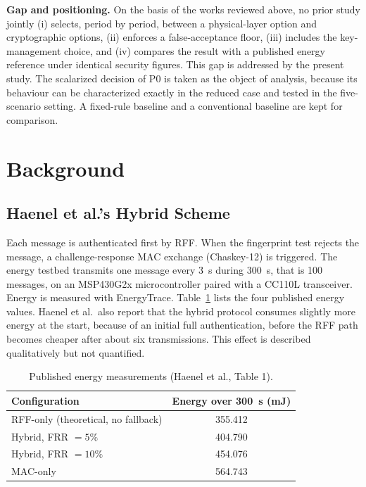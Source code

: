 \documentclass[conference]{IEEEtran}
\begin{document}
\textbf{Gap and positioning.} On the basis of the works reviewed above, no prior study jointly (i) selects, period by period, between a physical-layer option and cryptographic options, (ii) enforces a false-acceptance floor, (iii) includes the key-management choice, and (iv) compares the result with a published energy reference under identical security figures. This gap is addressed by the present study. The scalarized decision of P0 is taken as the object of analysis, because its behaviour can be characterized exactly in the reduced case and tested in the five-scenario setting. A fixed-rule baseline and a conventional baseline are kept for comparison.

\section{Background}
\label{sec:background}

\subsection{Haenel et al.'s Hybrid Scheme}

Each message is authenticated first by RFF. When the fingerprint test rejects the message, a challenge-response MAC exchange (Chaskey-12) is triggered. The energy testbed transmits one message every 3~s during 300~s, that is 100 messages, on an MSP430G2x microcontroller paired with a CC110L transceiver. Energy is measured with EnergyTrace. Table~\ref{tab:published} lists the four published energy values. Haenel et al.\ also report that the hybrid protocol consumes slightly more energy at the start, because of an initial full authentication, before the RFF path becomes cheaper after about six transmissions. This effect is described qualitatively but not quantified.

\begin{table}[t]
\centering
\caption{Published energy measurements (Haenel et al., Table 1).}
\label{tab:published}
\begin{tabular}{lc}
\toprule
Configuration & Energy over 300~s (mJ) \\
\midrule
RFF-only (theoretical, no fallback) & 355.412 \\
Hybrid, FRR $=5\%$ & 404.790 \\
Hybrid, FRR $=10\%$ & 454.076 \\
MAC-only & 564.743 \\
\bottomrule
\end{tabular}
\end{table}
\end{document}
